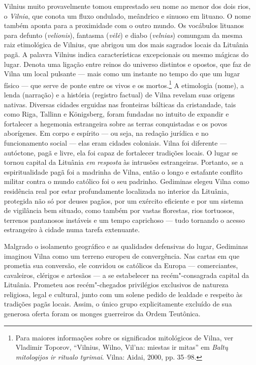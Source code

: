 Vilnius muito provavelmente tomou emprestado seu nome ao menor dos dois
rios, o \textit{Vilnia}, que conota um fluxo ondulado, meândrico e sinuoso
em lituano. O nome também aponta para a proximidade com o outro mundo.
Os vocábulos lituanos para defunto (\textit{velionis}), fantasma
(\textit{vėlė}) e diabo (\textit{velnias}) comungam da mesma raiz
etimológica de Vilnius, que abrigou um dos mais sagrados locais da
Lituânia pagã. A palavra Vilnius indica características excepcionais ou
mesmo mágicas do lugar. Denota uma ligação entre reinos do universo
distintos e opostos, que faz de Vilna um local pulsante --- mais como um
instante no tempo do que um lugar físico --- que serve de ponte entre os
vivos e os mortos.\footnote{Para maiores informações sobre os significados mitológicos de Vilna, ver Vladimir Toporov, ``Vilnius, Wilno, Vil'na: miestas ir mitas'' em \textit{Baltų mitologijos ir ritualo tyrimai}. Vilna: Aidai, 2000, pp. 35--98.}
A etimologia (nome), a lenda (narração) e a história (registro factual)
de Vilna revelam suas origens nativas. Diversas cidades erguidas nas
fronteiras bálticas da cristandade, tais como Riga, Tallinn e
Königsberg, foram fundadas no intuito de expandir e fortalecer a
hegemonia estrangeira sobre as terras conquistadas e os povos
aborígenes. Em corpo e espírito --- ou seja, na redação jurídica e no
funcionamento social --- elas eram cidades coloniais. Vilna foi diferente
--- autóctone, pagã e livre, ela foi capaz de fortalecer tradições locais.
O lugar se tornou capital da Lituânia \textit{em resposta} às intrusões
estrangeiras. Portanto, se a espiritualidade pagã foi a madrinha de
Vilna, então o longo e estafante conflito militar contra o mundo
católico foi o seu padrinho. Gediminas elegeu Vilna como residência real
por estar profundamente localizada no interior da Lituânia, protegida
não só por deuses pagãos, por um exército eficiente e por um sistema de
vigilância bem situado, como também por vastas florestas, rios
tortuosos, terrenos pantanosos instáveis e um tempo caprichoso --- tudo
tornando o acesso estrangeiro à cidade numa tarefa extenuante.

%

Malgrado o isolamento geográfico e as qualidades defensivas do lugar,
Gediminas imaginou Vilna como um terreno europeu de convergência. Nas
cartas em que prometia sua conversão, ele convidou os católicos da
Europa --- comerciantes, cavaleiros, clérigos e artesãos --- a se
estabelecer na recém"-consagrada capital da Lituânia. Prometeu aos
recém"-chegados privilégios exclusivos de natureza religiosa, legal e
cultural, junto com um solene pedido de lealdade e respeito às tradições
pagãs locais. Assim, o único grupo explicitamente excluído de sua
generosa oferta foram os monges guerreiros da Ordem Teutônica.

